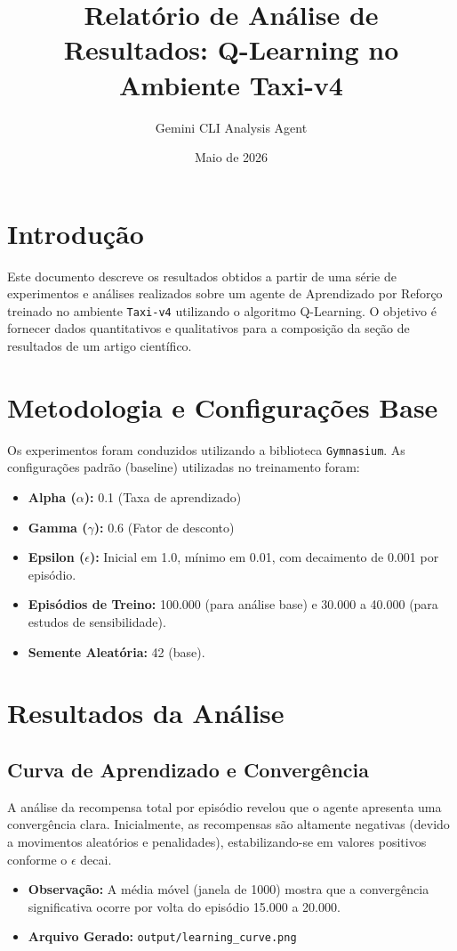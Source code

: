\documentclass{article}
\title{Relatório de Análise de Resultados: Q-Learning no Ambiente Taxi-v4}
\author{Gemini CLI Analysis Agent}
\date{Maio de 2026}
\begin{document}
\maketitle

\section{Introdução}
Este documento descreve os resultados obtidos a partir de uma série de experimentos e análises realizados sobre um agente de Aprendizado por Reforço treinado no ambiente \texttt{Taxi-v4} utilizando o algoritmo Q-Learning. O objetivo é fornecer dados quantitativos e qualitativos para a composição da seção de resultados de um artigo científico.

\section{Metodologia e Configurações Base}
Os experimentos foram conduzidos utilizando a biblioteca \texttt{Gymnasium}. As configurações padrão (baseline) utilizadas no treinamento foram:
\begin{itemize}
    \item \textbf{Alpha ($\alpha$):} 0.1 (Taxa de aprendizado)
    \item \textbf{Gamma ($\gamma$):} 0.6 (Fator de desconto)
    \item \textbf{Epsilon ($\epsilon$):} Inicial em 1.0, mínimo em 0.01, com decaimento de 0.001 por episódio.
    \item \textbf{Episódios de Treino:} 100.000 (para análise base) e 30.000 a 40.000 (para estudos de sensibilidade).
    \item \textbf{Semente Aleatória:} 42 (base).
\end{itemize}

\section{Resultados da Análise}

\subsection{Curva de Aprendizado e Convergência}
A análise da recompensa total por episódio revelou que o agente apresenta uma convergência clara. Inicialmente, as recompensas são altamente negativas (devido a movimentos aleatórios e penalidades), estabilizando-se em valores positivos conforme o $\epsilon$ decai.
\begin{itemize}
    \item \textbf{Observação:} A média móvel (janela de 1000) mostra que a convergência significativa ocorre por volta do episódio 15.000 a 20.000.
    \item \textbf{Arquivo Gerado:} \texttt{output/learning\_curve.png}
\end{itemize}
\end{document}
